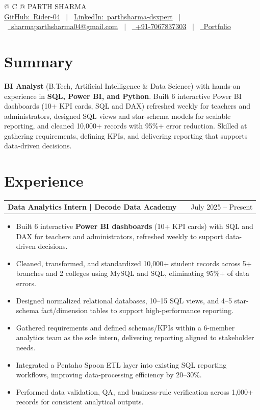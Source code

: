 \documentclass[a4paper,10pt]{article}
\makeatletter
\newcommand{\faGithub}{GitHub:}\newcommand{\faLinkedin}{LinkedIn:}\newcommand{\faEnvelope}{}%
\newcommand{\faMobile}{}\newcommand{\faGlobe}{}}
\newenvironment{joblong}[2]
    {
    \begin{tabularx}{\linewidth}{@{}l X r@{}}
    \textbf{#1} & \hfill &  #2 \\[2pt]
    \end{tabularx}
    \begin{minipage}[t]{\linewidth}
    \begin{itemize}[nosep,after=\strut, leftmargin=1em, itemsep=1pt,label=--]
    }
    {
    \end{itemize}
    \end{minipage}
    }
\makeatother
\begin{document}
\pagestyle{empty}

\begin{tabularx}{\linewidth}{@{} C @{}}
\Huge{PARTH SHARMA} \\[5pt]
\href{https://github.com/Rider-04}{\raisebox{-0.05\height}\faGithub\ Rider-04} \ $|$ \
\href{https://www.linkedin.com/in/parthsharma-dsxpert}{\raisebox{-0.05\height}\faLinkedin\ parthsharma-dsxpert} \ $|$ \
\href{mailto:sharmaparthsharma04@gmail.com}{\raisebox{-0.05\height}\faEnvelope \ sharmaparthsharma04@gmail.com} \ $|$ \
\href{tel:+917067837303}{\raisebox{-0.05\height}\faMobile \ +91-7067837303} \ $|$ \
\href{https://parth-portfolio-virid.vercel.app/}{\raisebox{-0.05\height}\faGlobe \ Portfolio}
\end{tabularx}

\section{Summary}
\textbf{BI Analyst} (B.Tech, Artificial Intelligence \& Data Science) with hands-on experience in \textbf{SQL, Power BI, and Python}. Built 6 interactive Power BI dashboards (10+ KPI cards, SQL and DAX) refreshed weekly for teachers and administrators, designed SQL views and star-schema models for scalable reporting, and cleaned 10,000+ records with 95\%+ error reduction. Skilled at gathering requirements, defining KPIs, and delivering reporting that supports data-driven decisions.

\section{Experience}
\begin{joblong}{Data Analytics Intern | Decode Data Academy}{July 2025 -- Present}
\item Built 6 interactive \textbf{Power BI dashboards} (10+ KPI cards) with SQL and DAX for teachers and administrators, refreshed weekly to support data-driven decisions.
\item Cleaned, transformed, and standardized 10,000+ student records across 5+ branches and 2 colleges using MySQL and SQL, eliminating 95\%+ of data errors.
\item Designed normalized relational databases, 10--15 SQL views, and 4--5 star-schema fact/dimension tables to support high-performance reporting.
\item Gathered requirements and defined schemas/KPIs within a 6-member analytics team as the sole intern, delivering reporting aligned to stakeholder needs.
\item Integrated a Pentaho Spoon ETL layer into existing SQL reporting workflows, improving data-processing efficiency by 20--30\%.
\item Performed data validation, QA, and business-rule verification across 1,000+ records for consistent analytical outputs.
\end{joblong}
\end{document}
